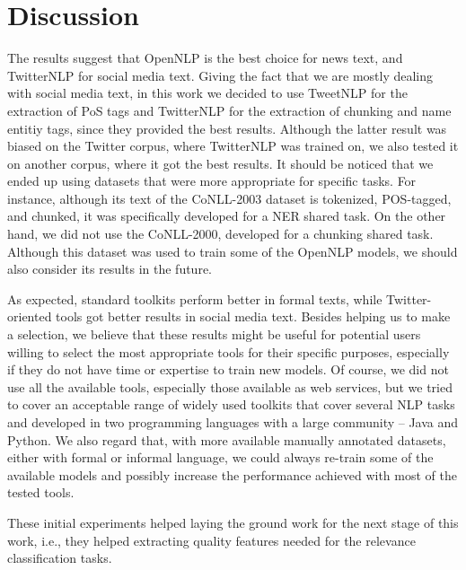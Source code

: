 \section{Discussion}

The results suggest that OpenNLP is the best choice for news text, and TwitterNLP for social media text. Giving the fact that we are mostly dealing with social media text, in this work we decided to use TweetNLP for the extraction of PoS tags and TwitterNLP for the extraction of chunking and name entitiy tags, since they provided the best results.
Although the latter result was biased on the Twitter corpus, where TwitterNLP was trained on, we also tested it on another corpus, where it got the best results.
It should be noticed that we ended up using datasets that were more appropriate for specific tasks. For instance, although its text of the CoNLL-2003 dataset is tokenized, POS-tagged, and chunked, it was specifically developed for a NER shared task. On the other hand, we did not use the CoNLL-2000, developed for a chunking shared task. Although this dataset was used to train some of the OpenNLP models, we should also consider its results in the future.

As expected, standard toolkits perform better in formal texts, while Twitter-oriented tools got better results in social media text.
Besides helping us to make a selection, we believe that these results might be useful for potential users willing to select the most appropriate tools for their specific purposes, especially if they do not have time or expertise to train new models.
Of course, we did not use all the available tools, especially those available as web services, but we tried to cover an acceptable range of widely used toolkits that cover several NLP tasks and developed in two programming languages with a large community -- Java and Python.
We also regard that, with more available manually annotated datasets, either with formal or informal language, we could always re-train some of the available models and possibly increase the performance achieved with most of the tested tools.

These initial experiments helped laying the ground work for the next stage of this work, i.e., they helped extracting quality features needed for the relevance classification tasks.  